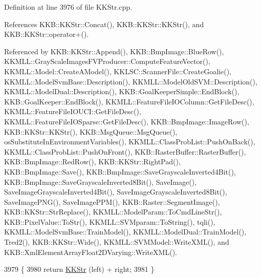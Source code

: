 Definition at line 3976 of file K\+K\+Str.\+cpp.



References K\+K\+B\+::\+K\+K\+Str\+::\+Concat(), K\+K\+B\+::\+K\+K\+Str\+::\+K\+K\+Str(), and K\+K\+B\+::\+K\+K\+Str\+::operator+().



Referenced by K\+K\+B\+::\+K\+K\+Str\+::\+Append(), K\+K\+B\+::\+Bmp\+Image\+::\+Blue\+Row(), K\+K\+M\+L\+L\+::\+Gray\+Scale\+Images\+F\+V\+Producer\+::\+Compute\+Feature\+Vector(), K\+K\+M\+L\+L\+::\+Model\+::\+Create\+A\+Model(), K\+K\+L\+S\+C\+::\+Scanner\+File\+::\+Create\+Goalie(), K\+K\+M\+L\+L\+::\+Model\+Svm\+Base\+::\+Description(), K\+K\+M\+L\+L\+::\+Model\+Old\+S\+V\+M\+::\+Description(), K\+K\+M\+L\+L\+::\+Model\+Dual\+::\+Description(), K\+K\+B\+::\+Goal\+Keeper\+Simple\+::\+End\+Block(), K\+K\+B\+::\+Goal\+Keeper\+::\+End\+Block(), K\+K\+M\+L\+L\+::\+Feature\+File\+I\+O\+Column\+::\+Get\+File\+Desc(), K\+K\+M\+L\+L\+::\+Feature\+File\+I\+O\+U\+C\+I\+::\+Get\+File\+Desc(), K\+K\+M\+L\+L\+::\+Feature\+File\+I\+O\+Sparse\+::\+Get\+File\+Desc(), K\+K\+B\+::\+Bmp\+Image\+::\+Image\+Row(), K\+K\+B\+::\+K\+K\+Str\+::\+K\+K\+Str(), K\+K\+B\+::\+Msg\+Queue\+::\+Msg\+Queue(), os\+Substitute\+In\+Environment\+Variables(), K\+K\+M\+L\+L\+::\+Class\+Prob\+List\+::\+Push\+On\+Back(), K\+K\+M\+L\+L\+::\+Class\+Prob\+List\+::\+Push\+On\+Front(), K\+K\+B\+::\+Raster\+Buffer\+::\+Raster\+Buffer(), K\+K\+B\+::\+Bmp\+Image\+::\+Red\+Row(), K\+K\+B\+::\+K\+K\+Str\+::\+Right\+Pad(), K\+K\+B\+::\+Bmp\+Image\+::\+Save(), K\+K\+B\+::\+Bmp\+Image\+::\+Save\+Grayscale\+Inverted4\+Bit(), K\+K\+B\+::\+Bmp\+Image\+::\+Save\+Grayscale\+Inverted8\+Bit(), Save\+Image(), Save\+Image\+Grayscale\+Inverted4\+Bit(), Save\+Image\+Grayscale\+Inverted8\+Bit(), Save\+Image\+P\+N\+G(), Save\+Image\+P\+P\+M(), K\+K\+B\+::\+Raster\+::\+Segment\+Image(), K\+K\+B\+::\+K\+K\+Str\+::\+Str\+Replace(), K\+K\+M\+L\+L\+::\+Model\+Param\+::\+To\+Cmd\+Line\+Str(), K\+K\+B\+::\+Pixel\+Value\+::\+To\+Str(), K\+K\+M\+L\+L\+::\+S\+V\+Mparam\+::\+To\+String(), tqli(), K\+K\+M\+L\+L\+::\+Model\+Svm\+Base\+::\+Train\+Model(), K\+K\+M\+L\+L\+::\+Model\+Dual\+::\+Train\+Model(), Tred2(), K\+K\+B\+::\+K\+K\+Str\+::\+Wide(), K\+K\+M\+L\+L\+::\+S\+V\+M\+Model\+::\+Write\+X\+M\+L(), and K\+K\+B\+::\+Xml\+Element\+Array\+Float2\+D\+Varying\+::\+Write\+X\+M\+L().


\begin{DoxyCode}
3979 \{
3980   \textcolor{keywordflow}{return}  \hyperlink{class_k_k_b_1_1_k_k_str}{KKStr} (left) + right;
3981 \}
\end{DoxyCode}
